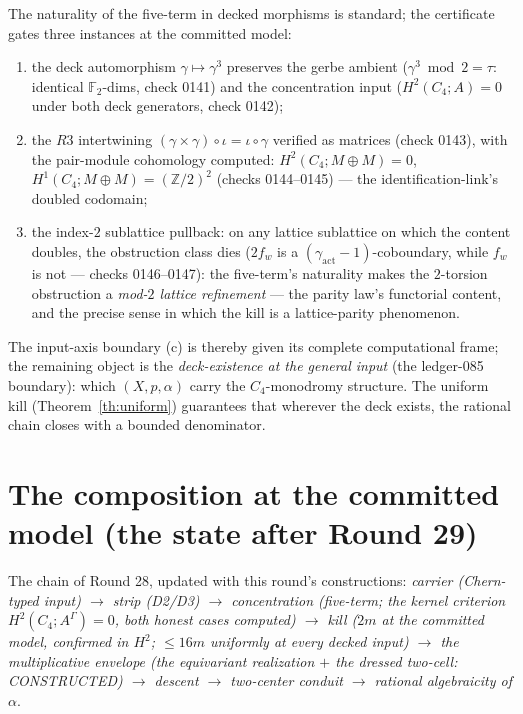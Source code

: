 \documentclass[11pt]{article}
\newcommand{\GammaL}{\Gamma}
\newcommand{\Cfour}{C_4}
\newcommand{\Z}{\mathbb{Z}}
\newcommand{\F}{\mathbb{F}}
\begin{document}
The naturality of the five-term in decked morphisms is standard; the
certificate gates three instances at the committed model:
\begin{enumerate}
\item[(i)] the deck automorphism $\gamma\mapsto\gamma^3$ preserves the
gerbe ambient ($\gamma^3\bmod2=\tau$: identical $\F_2$-dims, check
0141) and the concentration input ($H^2(\Cfour;A)=0$ under both deck
generators, check 0142);
\item[(ii)] the $R3$ intertwining
$(\gamma\times\gamma)\circ\iota=\iota\circ\gamma$ verified as matrices
(check 0143), with the pair-module cohomology computed:
$H^2(\Cfour;M\oplus M)=0$, $H^1(\Cfour;M\oplus M)=(\Z/2)^2$ (checks
0144--0145) --- the identification-link's doubled codomain;
\item[(iii)] the index-$2$ sublattice pullback: on any lattice
sublattice on which the content doubles, the obstruction class dies
($2f_w$ is a $(\gamma_{\mathrm{act}}-1)$-coboundary, while $f_w$ is
not --- checks 0146--0147): the five-term's naturality makes the
$2$-torsion obstruction a \emph{mod-$2$ lattice refinement} --- the
parity law's functorial content, and the precise sense in which the
kill is a lattice-parity phenomenon.
\end{enumerate}
The input-axis boundary (c) is thereby given its complete
computational frame; the remaining object is the
\emph{deck-existence at the general input} (the ledger-085 boundary):
which $(X,p,\alpha)$ carry the $\Cfour$-monodromy structure. The
uniform kill (Theorem~\ref{th:uniform}) guarantees that wherever the
deck exists, the rational chain closes with a bounded denominator.

\section{The composition at the committed model (the state after
Round 29)}

The chain of Round 28, updated with this round's constructions:
\emph{carrier (Chern-typed input) $\to$ strip (D2/D3) $\to$
concentration (five-term; the kernel criterion
$H^2(\Cfour;A^\GammaL)=0$, both honest cases computed) $\to$ kill
($2m$ at the committed model, confirmed in $H^2$; $\le16m$ uniformly
at every decked input) $\to$ the multiplicative envelope (the
equivariant realization $+$ the dressed two-cell: CONSTRUCTED) $\to$
descent $\to$ two-center conduit $\to$ rational algebraicity of
$\alpha$}.
\end{document}
